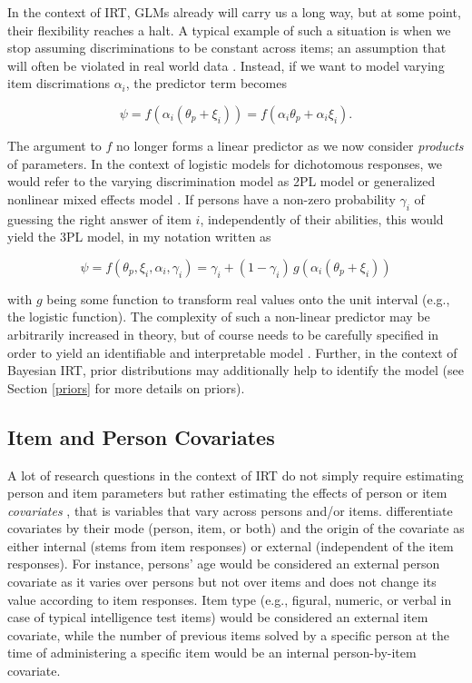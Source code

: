 \documentclass[
]{jss}
\begin{document}
In the context of IRT, GLMs already will carry us a long way, but at
some point, their flexibility reaches a halt. A typical example of such
a situation is when we stop assuming discriminations to be constant
across items; an assumption that will often be violated in real world
data \citep{andrich2004}. Instead, if we want to model varying item
discrimations \(\alpha_i\), the predictor term becomes

\[
\psi = f(\alpha_i (\theta_p + \xi_i)) = f(\alpha_i \theta_p + \alpha_i \xi_i).
\]

The argument to \(f\) no longer forms a linear predictor as we now
consider \emph{products} of parameters. In the context of logistic
models for dichotomous responses, we would refer to the varying
discrimination model as 2PL model \citep[e.g.,][]{andrich2004} or
generalized nonlinear mixed effects model \citep[e.g.,][]{deboeck2004}.
If persons have a non-zero probability \(\gamma_i\) of guessing the
right answer of item \(i\), independently of their abilities, this would
yield the 3PL model, in my notation written as

\[
\psi = f(\theta_{p}, \xi_{i}, \alpha_i, \gamma_i) = 
\gamma_i + (1 - \gamma_i) \, g(\alpha_i (\theta_p + \xi_i))
\]

with \(g\) being some function to transform real values onto the unit
interval (e.g., the logistic function). The complexity of such a
non-linear predictor may be arbitrarily increased in theory, but of
course needs to be carefully specified in order to yield an identifiable
and interpretable model \citep[see also][]{buerkner2020spm}. Further, in
the context of Bayesian IRT, prior distributions may additionally help
to identify the model (see Section \ref{priors} for more details on
priors).

\hypertarget{item-and-person-covariates}{%
\subsection{Item and Person
Covariates}\label{item-and-person-covariates}}

A lot of research questions in the context of IRT do not simply require
estimating person and item parameters but rather estimating the effects
of person or item \emph{covariates} \citep{deboeck2011}, that is
variables that vary across persons and/or items. \citet{deboeck2011}
differentiate covariates by their mode (person, item, or both) and the
origin of the covariate as either internal (stems from item responses)
or external (independent of the item responses). For instance, persons'
age would be considered an external person covariate as it varies over
persons but not over items and does not change its value according to
item responses. Item type (e.g., figural, numeric, or verbal in case of
typical intelligence test items) would be considered an external item
covariate, while the number of previous items solved by a specific
person at the time of administering a specific item would be an internal
person-by-item covariate.
\end{document}
